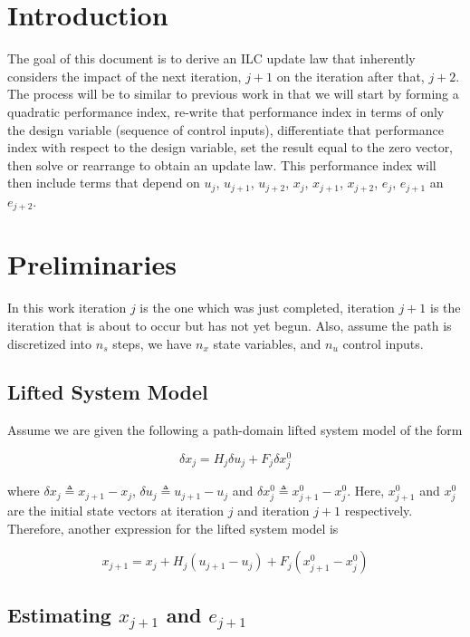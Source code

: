 \documentclass[landscape]{article}
\begin{document}
\section{Introduction}
The goal of this document is to derive an ILC update law that inherently considers the impact of the next iteration, $j+1$ on the iteration after that, $j+2$.  The process will be to similar to previous work in that we will start by forming a quadratic performance index, re-write that performance index in terms of only the design variable (sequence of control inputs), differentiate that performance index with respect to the design variable, set the result equal to the zero vector, then solve or rearrange to obtain an update law.  This performance index will then include terms that depend on $u_j$, $u_{j+1}$, $u_{j+2}$, $x_j$, $x_{j+1}$, $x_{j+2}$, $e_j$, $e_{j+1}$ an $e_{j+2}$.

\section{Preliminaries}

In this work iteration $j$ is the one which was just completed, iteration $j+1$ is the iteration that is about to occur but has not yet begun.  Also, assume the path is discretized into $n_s$ steps, we have $n_x$ state variables, and $n_u$ control inputs.

\subsection{Lifted System Model}

Assume we are given the following a path-domain lifted system model of the form

\begin{equation}
\delta x_j = H_j \delta u_j + F_j \delta x_j^0
\end{equation}

where $\delta x_j \triangleq x_{j+1} - x_j$, $\delta u_j \triangleq u_{j+1} - u_j$ and $\delta x_j^0 \triangleq x^0_{j+1} - x^0_j$.  Here, $x^0_{j+1}$ and $x^0_j$ are the initial state vectors at iteration $j$ and iteration $j+1$ respectively.  Therefore, another expression for the lifted system model is

\begin{equation}
x_{j+1} = x_j + H_j \left(u_{j+1} - u_j\right) + F_j \left(x^0_{j+1} - x^0_j\right)
\end{equation}

\subsection{Estimating $x_{j+1}$ and $e_{j+1}$}
\end{document}

